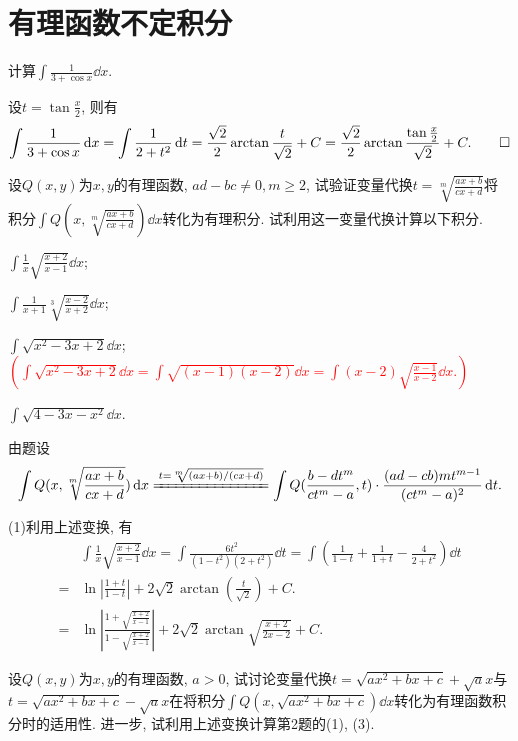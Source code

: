 \section{有理函数不定积分}
\begin{quiza}
\woe 计算\(\int\frac{1}{3+\cos x}\dd x\).
\begin{solution}
设\(t=\tan\frac{x}{2}\), 则有\[\int\frac{1}{3+\cos x}\,\mathrm{d} x=\int\frac{1}{2+t^2}\,\mathrm{d} t=\frac{\sqrt{2}}{2}\arctan\frac{t}{\sqrt{2}}+C=\frac{\sqrt{2}}{2}\arctan\frac{\tan\frac{x}{2}}{\sqrt{2}}+C.\qedhere\]
\end{solution}
\woe 设\(Q(x,y)\)为\(x,y\)的有理函数, \(ad-bc\ne 0,m\geqslant 2\), 试验证变量代换\(t=\sqrt[m]{\frac{ax+b}{cx+d}}\)将积分\(\int Q(x,\sqrt[m]{\frac{ax+b}{cx+d}})\dd x\)转化为有理积分. 试利用这一变量代换计算以下积分.
\begin{quizs}
\item \(\int\frac{1}{x}\sqrt{\frac{x+2}{x-1}}\dd x\);
\item \(\int\frac{1}{x+1}\sqrt[3]{\frac{x-2}{x+2}}\dd x\);
\item \(\int\sqrt{x^2-3x+2}\dd x\);\quad\textcolor{red}{\(\left(\int\sqrt{x^2-3x+2}\dd x=\int\sqrt{(x-1)(x-2)}\dd x=\int (x-2)\sqrt{\frac{x-1}{x-2}}\dd x.\right)\)}
\item \(\int\sqrt{4-3x-x^2}\dd x\).
\end{quizs}
\begin{solution}
由题设
\[\int Q(x,\sqrt[m]{\frac{ax+b}{cx+d}})\dd x\xlongequal{t=\sqrt[m]{\left( ax+b \right) /\left( cx+d \right)}}\int Q(\frac{b-dt^m}{ct^m-a},t)\cdot\frac{(ad-cb)mt^{m-1}}{(ct^m-a)^2}\dd t.\]

(1)利用上述变换, 有\[\begin{split}
&\int\frac{1}{x}\sqrt{\frac{x+2}{x-1}}\dd x=\int\frac{6t^2}{(1-t^2)(2+t^2)}\dd t=\int\left(\frac{1}{1-t}+\frac{1}{1+t}-\frac{4}{2+t^2}\right)\dd t\\=&\ln\left|\frac{1+t}{1-t}\right|+2\sqrt{2}\arctan\left(\frac{t}{\sqrt{2}}\right)+C.\\=&\ln\left|\frac{1+\sqrt{\frac{x+2}{x-1}}}{1-\sqrt{\frac{x+2}{x-1}}}\right|+2\sqrt{2}\arctan\sqrt{\frac{x+2}{2x-2}}+C.
\end{split}\]
\end{solution}
\woe 设\(Q(x,y)\)为\(x,y\)的有理函数, \(a>0\), 试讨论变量代换\(t=\sqrt{ax^2+bx+c}+\sqrt{a}x\)与\(t=\sqrt{ax^2+bx+c}-\sqrt{a}x\)在将积分\(\int Q(x,\sqrt{ax^2+bx+c})\dd x\)转化为有理函数积分时的适用性. 进一步, 试利用上述变换计算第2题的(1), (3).
\begin{solution}
	

\end{solution}
\end{quiza}
